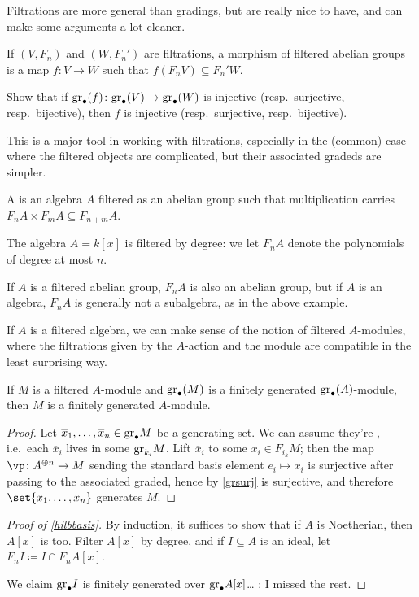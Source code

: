 Filtrations are more general than gradings, but are really nice to have, and can make some arguments a lot cleaner.
\begin{defn}
If $(V, F_n)$ and $(W, F_n')$ are filtrations, a morphism of filtered abelian groups is a map $f\colon V\to W$ such
that $f(F_nV)\subseteq F_n'W$.
\end{defn}
\begin{ex}
\label{grsurj}
Show that if $\mathrm{gr}_\bullet(f)\colon\mathrm{gr}_\bullet(V)\to\mathrm{gr}_\bullet(W)$ is injective (resp.\ surjective, resp.\
bijective), then $f$ is injective (resp.\ surjective, resp.\ bijective).
\end{ex}
This is a major tool in working with filtrations, especially in the (common) case where the filtered objects are
complicated, but their associated gradeds are simpler.
\begin{defn}
A  is an algebra $A$ filtered as an abelian group such that multiplication carries
$F_nA\times F_mA\subseteq F_{n+m}A$.
\end{defn}
\begin{exm}
The algebra $A = k[x]$ is filtered by degree: we let $F_nA$ denote the polynomials of degree at most $n$.
\end{exm}
If $A$ is a filtered abelian group, $F_nA$ is also an abelian group, but if $A$ is an algebra, $F_nA$ is generally
not a subalgebra, as in the above example.

If $A$ is a filtered algebra, we can make sense of the notion of filtered $A$-modules, where the filtrations given
by the $A$-action and the module are compatible in the least surprising way.
\begin{lem}
If $M$ is a filtered $A$-module and $\mathrm{gr}_\bullet(M)$ is a finitely generated $\mathrm{gr}_\bullet(A)$-module, then $M$ is a
finitely generated $A$-module.
\end{lem}
\begin{proof}
Let $\overline x_1,\dotsc,\overline x_n\in\mathrm{gr}_\bullet M$ be a generating set. We can assume they're
\term{homogeneous}, i.e.\ each $\overline x_i$ lives in some $\mathrm{gr}_{k_i}M$. Lift $\overline x_i$ to some $x_i\in
F_{i_k}M$; then the map $\vp\colon A^{\oplus n}\to M$ sending the standard basis element $e_i\mapsto x_i$ is
surjective after passing to the associated graded, hence by \cref{grsurj} is surjective, and therefore
$\set{x_1,\dotsc,x_n}$ generates $M$.
\end{proof}
\begin{proof}[Proof of \cref{hilbbasis}]
By induction, it suffices to show that if $A$ is Noetherian, then $A[x]$ is too. Filter $A[x]$ by degree, and if
$I\subseteq A$ is an ideal, let $F_nI\coloneqq I\cap F_nA[x]$.

We claim $\mathrm{gr}_\bullet I$ is finitely generated over $\mathrm{gr}_\bullet A[x]$\dots{} \TODO: I missed the rest.
\end{proof}
